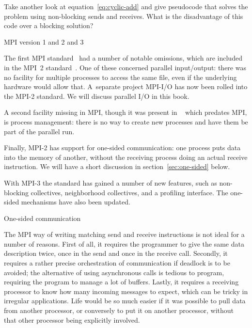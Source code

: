 \begin{exercise}
  Take another look at equation~\eqref{eq:cyclic-add} and give pseudocode that
  solves the problem using non-blocking sends and receives. What is
  the disadvantage of this code over a blocking solution?
\end{exercise}

 {MPI version 1 and 2 and 3}
\label{sec:mpi-1-2}

The first MPI standard~\cite{mpi-ref} had a number of notable
omissions, which are included in the MPI~2
standard~\cite{mpi-2-reference}. One of these concerned parallel
input/output: there was no facility for multiple processes to access
the same file, even if the underlying hardware would allow
that. A~separate project MPI-I/O has now been rolled into the MPI-2
standard. We will discuss parallel I/O in this book.

A second facility missing in MPI, though it was present in
~\cite{pvm-1,pvm-2} which predates MPI, is process
management: there is no way to create new processes and have them be
part of the parallel run.

Finally, MPI-2 has support for one-sided communication: one process
puts data into the memory of another, without the receiving process
doing an actual receive instruction. We will have a short discussion
in section~\ref{sec:one-sided} below.

With MPI-3 the standard has gained a number of new features, such as
non-blocking collectives, neighborhood collectives, and a profiling
interface. The one-sided mechanisms have also been updated.

 {One-sided communication}
\label{sec:one-sided}

The MPI way of writing matching send and receive instructions is not
ideal for a number of reasons. First of all, it requires the
programmer to give the same data description twice, once in the send
and once in the receive call. Secondly, it requires a rather precise
orchestration of communication if deadlock is to be avoided; the
alternative of using asynchronous calls is tedious to program,
requiring the program to manage a lot of buffers.
Lastly, it requires a receiving processor to know how many incoming
messages to expect, which can be tricky in irregular applications.
Life would be so much easier if it was
possible to pull data from another processor, or conversely to put it
on another processor, without that other processor being explicitly
involved. 

